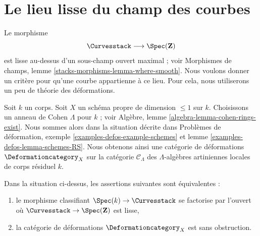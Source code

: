 \section{Le lieu lisse du champ des courbes}
\label{section-smooth}

\noindent
Le morphisme
$$
\Curvesstack \longrightarrow \Spec(\mathbf{Z})
$$
est lisse au-dessus d'un sous-champ ouvert maximal ; voir
Morphismes de champs, lemme \ref{stacks-morphisms-lemma-where-smooth}.
Nous voulons donner un critère pour qu'une courbe appartienne à ce lieu.
Pour cela, nous utiliserons un peu de théorie des déformations.

\medskip\noindent
Soit $k$ un corps. Soit $X$ un schéma propre de dimension $\leq 1$ sur $k$.
Choisissons un anneau de Cohen $\Lambda$ pour $k$ ; voir
Algèbre, lemme \ref{algebra-lemma-cohen-rings-exist}.
Nous sommes alors dans la situation décrite dans
Problèmes de déformation, exemple \ref{examples-defos-example-schemes} et
lemme \ref{examples-defos-lemma-schemes-RS}.
Nous obtenons ainsi une catégorie de déformations $\Deformationcategory_X$
sur la catégorie $\mathcal{C}_\Lambda$ des $\Lambda$-algèbres artiniennes
locales de corps résiduel $k$.

\begin{lemma}
\label{lemma-in-smooth-locus}
Dans la situation ci-dessus, les assertions suivantes sont équivalentes :
\begin{enumerate}
\item le morphisme classifiant $\Spec(k) \to \Curvesstack$ se factorise
par l'ouvert où $\Curvesstack \to \Spec(\mathbf{Z})$ est lisse,
\item la catégorie de déformations $\Deformationcategory_X$ est sans obstruction.
\end{enumerate}
\end{lemma}

